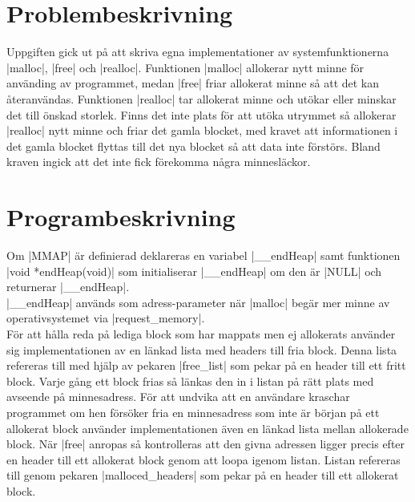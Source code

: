 \documentclass[paper=a4, fontsize=11pt]{scrartcl} %
\numberwithin{equation}{section} %
\numberwithin{figure}{section} %
\numberwithin{table}{section} %
\begin{document}
\section{Problembeskrivning}
Uppgiften gick ut på att skriva egna implementationer av systemfunktionerna
|malloc|, |free| och |realloc|.
Funktionen |malloc| allokerar nytt minne för använding av programmet, medan
|free| friar allokerat minne så att det kan återanvändas.
Funktionen |realloc| tar allokerat minne och utökar eller minskar det till
önskad storlek.
Finns det inte plats för att utöka utrymmet så allokerar |realloc| nytt minne
och friar det gamla blocket, med kravet att informationen i det gamla blocket
flyttas till det nya blocket så att data inte förstörs.
Bland kraven ingick att det inte fick förekomma några minnesläckor.



\section{Programbeskrivning}

%
%
Om |MMAP| är definierad deklareras en variabel |__endHeap| samt funktionen 
|void *endHeap(void)| som initialiserar |__endHeap| om den är |NULL| och
returnerar |__endHeap|.\\

|__endHeap| används som adress-parameter när |malloc| begär mer minne av
operativsystemet via |request_memory|.\\

För att hålla reda på lediga block som har mappats men ej allokerats använder
sig implementationen av en länkad lista med headers till fria block.
Denna lista refereras till med hjälp av pekaren |free_list| som pekar på en
header till ett fritt block.
Varje gång ett block frias så länkas den in i listan på rätt plats med avseende
på minnesadress.
För att undvika att en användare kraschar programmet om hen försöker fria en
minnesadress som inte är början på ett allokerat block använder
implementationen även en länkad lista mellan allokerade block.
När |free| anropas så kontrolleras att den givna adressen ligger precis efter
en header till ett allokerat block genom att loopa igenom listan.
Listan refereras till genom pekaren |malloced_headers| som pekar på en header
till ett allokerat block.
\end{document}
